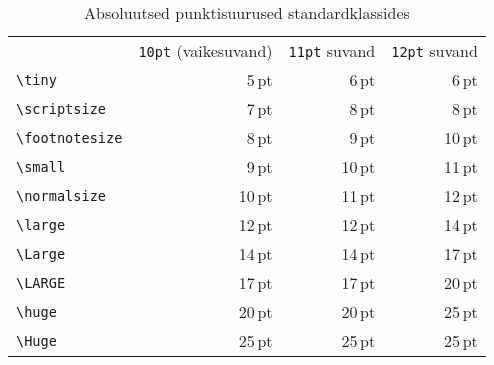 \begin{table}[!tbp]
\caption{Absoluutsed punktisuurused standardklassides}\label{tab:pointsizes}
\label{tab:sizes}
\begin{lined}{12cm}
\begin{tabular}{lrrr}
 &
\multicolumn{1}{c}{\texttt{10pt} (vaikesuvand) } &
           \multicolumn{1}{c}{\texttt{11pt} suvand}  &
           \multicolumn{1}{c}{\texttt{12pt} suvand}\\
\verb|\tiny|       & 5\,pt  & 6\,pt & 6\,pt\\
\verb|\scriptsize| & 7\,pt  & 8\,pt & 8\,pt\\
\verb|\footnotesize| & 8\,pt & 9\,pt & 10\,pt \\
\verb|\small|        & 9\,pt & 10\,pt & 11\,pt \\
\verb|\normalsize| & 10\,pt & 11\,pt & 12\,pt \\
\verb|\large|      & 12\,pt & 12\,pt & 14\,pt \\
\verb|\Large|      & 14\,pt & 14\,pt & 17\,pt \\
\verb|\LARGE|      & 17\,pt & 17\,pt & 20\,pt\\
\verb|\huge|       & 20\,pt & 20\,pt & 25\,pt\\
\verb|\Huge|       & 25\,pt & 25\,pt & 25\,pt\\
\end{tabular}

\bigskip
\end{lined}
\end{table}


